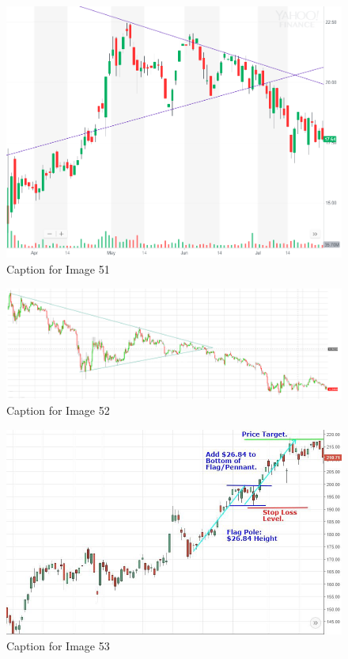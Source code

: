 \documentclass{article}
\begin{document}
\vspace{10pt}

\begin{figure}[!htb]
    \centering
    \includegraphics[width=500pt]{imgs/51.png}
    \caption{Caption for Image 51}
\end{figure}

\vspace{10pt}

\begin{figure}[!htb]
    \centering
    \includegraphics[width=\textwidth]{imgs/52.png}
    \caption{Caption for Image 52}
\end{figure}

\vspace{10pt}

\begin{figure}[!htb]
    \centering
    \includegraphics[width=\textwidth]{imgs/53.png}
    \caption{Caption for Image 53}
\end{figure}
\end{document}

